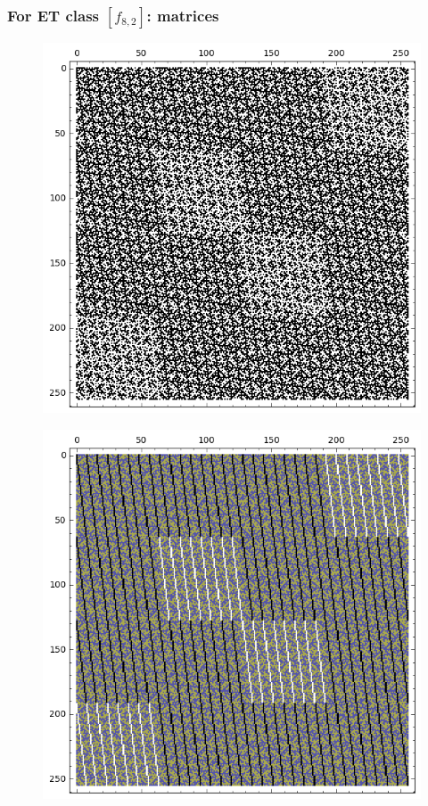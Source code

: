 \documentclass[pdf,sprung,slideColor,nocolorBG]{beamer}
\begin{document}
\begin{frame}
\frametitle{For ET class $[f_{8,2}]$: matrices}
\begin{figure}
\centering
\begin{minipage}{.48\textwidth}
  \centering
  \includegraphics[width=.9\linewidth]{../matrix_plot/c8_2_weight_class_matrix.png}
  \label{fig:8_2_weight_class_matrix}
\end{minipage}%
\begin{minipage}{.48\textwidth}
  \centering
  \includegraphics[width=.9\linewidth]{../matrix_plot/c8_2_bent_cayley_graph_index_matrix.png}
  \label{fig:8_2_bent_cayley_graph_index_matrix}
\end{minipage}
\end{figure}
~
\end{frame}
\end{document}
